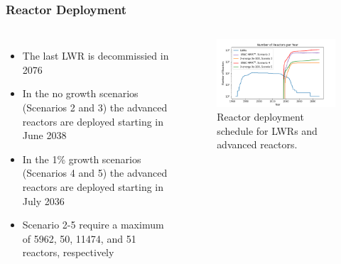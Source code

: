 \begin{frame}
    \frametitle{Reactor Deployment}
    \begin{columns}
        \column[t]{5cm}
        \begin{itemize}
            \item The last \gls{LWR} is decommissied in 2076
            \item In the no growth scenarios (Scenarios 2 and 3) the advanced reactors are 
                  deployed starting in June 2038
            \item In the 1\% growth scenarios (Scenarios 4 and 5) the advanced reactors are 
                  deployed starting in July 2036
            \item Scenario 2-5 require a maximum of 5962, 50, 11474, and 51 reactors, respectively
        \end{itemize}

        \column[t]{5cm}
        \vspace{-1cm}
        \begin{figure}
            \centering 
            \includegraphics[scale=0.3]{figures/rxdeployment_scenarios_all.png}
            \caption{Reactor deployment schedule for \glspl{LWR} and 
            advanced reactors.}
            \label{fig:rx_deployment}
        \end{figure}
    \end{columns}
\end{frame}

